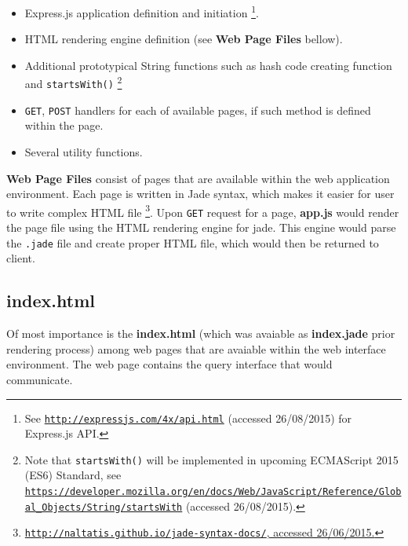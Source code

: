 \begin{itemize}
\item Express.js application definition and initiation \footnote{See \href{http://expressjs.com/4x/api.html}{\texttt{http://expressjs.com/4x/api.html}} (accessed 26/08/2015) for Express.js API.}.
\item HTML rendering engine definition (see \textbf{Web Page Files} bellow).
\item Additional prototypical String functions such as hash code creating function  and \texttt{startsWith()} \footnote{Note that \texttt{startsWith()} will be implemented in upcoming ECMAScript 2015 (ES6) Standard, see \href{https://developer.mozilla.org/en/docs/Web/JavaScript/Reference/Global_Objects/String/startsWith}{\texttt{https://developer.mozilla.org/en/docs/Web/JavaScript/Reference/Global\_Objects/String/startsWith}} (accessed 26/08/2015).}
\item \texttt{GET}, \texttt{POST} handlers for each of available pages, if such method is defined within the page.
\item Several utility functions.
\end{itemize}

\textbf{Web Page Files} consist of pages that are available within the web application environment. Each page is written in Jade syntax, which makes it easier for user to write complex HTML file \footnote{\href{http://naltatis.github.io/jade-syntax-docs/}{\texttt{http://naltatis.github.io/jade-syntax-docs/}, accessed 26/06/2015.}}. Upon \texttt{GET} request for a page, \textbf{app.js} would render the page file using the HTML rendering engine for jade. This engine would parse the \texttt{.jade} file and create proper HTML file, which would then be returned to client.

\subsection{index.html}

Of most importance is the \textbf{index.html} (which was avaiable as \textbf{index.jade} prior rendering process) among web pages that are avaiable within the web interface environment. The web page contains the query interface that would communicate.